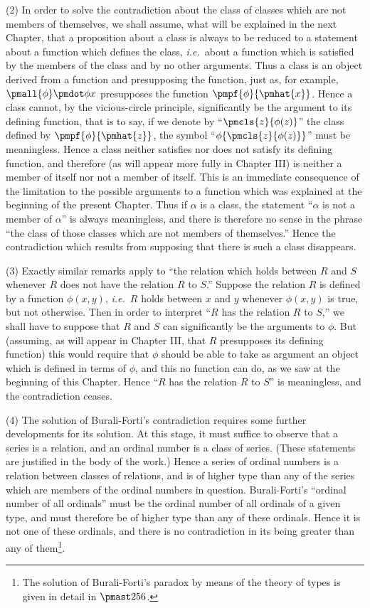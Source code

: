 \documentclass[letterpaper,12pt,openany,leqno]{book}
\newcommand{\pagefirst}[1]{\marginnote[\boxed{\text{#1}}]{\boxed{\text{#1}}}}
\begin{document}
(2) In order to solve the contradiction about the class of classes which are not members of themselves, we shall assume, what will be explained in the next Chapter, that a proposition about a class is always to be reduced to a statement about a function which defines the class, \textit{i.e.}\ about a function which is satisfied by the members of the class and by no other arguments. Thus a class is an object derived from a function and presupposing the function, just as, for example, $\pmall{\phi}\pmdot \phi x$ presupposes the function $\pmpf{\phi}{\pmhat{x}}$. Hence a class cannot, by the vicious-circle principle, significantly be the argument to its defining function, that is to say, if we denote \pagefirst{66} by ``$\pmcls{z}{\phi(z)}$'' the class defined by $\pmpf{\phi}{\pmhat{z}}$, the symbol ``$\phi\{\pmcls{z}{\phi(z)}\}$'' must be meaningless. Hence a class neither satisfies nor does not satisfy its defining function, and therefore (as will appear more fully in Chapter III) is neither a member of itself nor not a member of itself. This is an immediate consequence of the limitation to the possible arguments to a function which was explained at the beginning of the present Chapter. Thus if $\alpha$ is a class, the statement ``$\alpha$ is not a member of $\alpha$'' is always meaningless, and there is therefore no sense in the phrase ``the class of those classes which are not members of themselves.'' Hence the contradiction which results from supposing that there is such a class disappears.

(3) Exactly similar remarks apply to ``the relation which holds between $R$ and $S$ whenever $R$ does not have the relation $R$ to $S$.'' Suppose the relation $R$ is defined by a function $\phi(x, y)$, \textit{i.e.}\ $R$ holds between $x$ and $y$ whenever $\phi(x, y)$ is true, but not otherwise. Then in order to interpret ``$R$ has the relation $R$ to $S$,'' we shall have to suppose that $R$ and $S$ can significantly be the arguments to $\phi$. But (assuming, as will appear in Chapter III, that $R$ presupposes its defining function) this would require that $\phi$ should be able to take as argument an object which is defined in terms of $\phi$, and this no function can do, as we saw at the beginning of this Chapter. Hence ``$R$ has the relation $R$ to $S$'' is meaningless, and the contradiction ceases.

(4) The solution of Burali-Forti's contradiction requires some further developments for its solution. At this stage, it must suffice to observe that a series is a relation, and an ordinal number is a class of series. (These statements are justified in the body of the work.) Hence a series of ordinal numbers is a relation between classes of relations, and is of higher type than any of the series which are members of the ordinal numbers in question. Burali-Forti's ``ordinal number of all ordinals'' must be the ordinal number of all ordinals of a given type, and must therefore be of higher type than any of these ordinals. Hence it is not one of these ordinals, and there is no contradiction in its being greater than any of them\footnote{The solution of Burali-Forti's paradox by means of the theory of types is given in detail in $\pmast256$.}.
\end{document}
